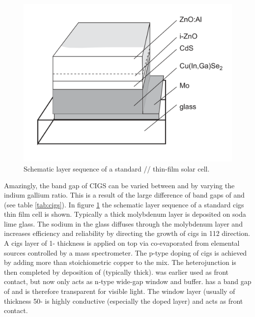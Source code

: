 \begin{figure}
	\includegraphics[width=\textwidth]{./Pics/cigs.png}
    \caption{Schematic layer sequence of a standard // thin-film solar cell.\cite{rau2013cigs}}
	\label{fig:cigs}
\end{figure}


Amazingly, the band gap of CIGS can be varied between  and  by varying the indium gallium ratio.
This is a result of the large difference of band gaps of  and  (see table \ref{tab:cigs}). 
In figure \ref{fig:cigs} the schematic layer sequence of a standard \gls{cigs} thin film cell is shown. 
Typically a  thick molybdenum layer is deposited on soda lime glass. 
The sodium in the glass diffuses through the molybdenum layer and increases efficiency and reliability by directing the growth of \gls{cigs} in 112 direction\cite{hedstrom1993cigs}.
A \gls{cigs} layer of 1- thickness is applied on top via co-evaporated from elemental sources controlled by a mass spectrometer.\cite{hedstrom1993cigs}
The p-type doping of \gls{cigs} is achieved by adding more than stoichiometric copper to the mix. 
The heterojunction is then completed by deposition of  (typically  thick).
 was earlier used as front contact, but now only acts as n-type wide-gap window and buffer. 
 has a band gap of  and is therefore transparent for visible light. 
The  window layer (usually of thickness 50- is highly conductive (especially the  doped layer) and acts as front contact. 

